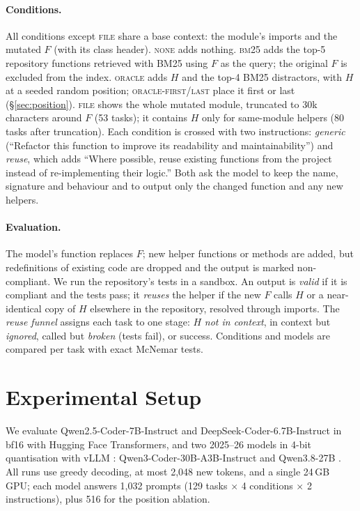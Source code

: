 \documentclass[11pt]{article}
\begin{document}
\paragraph{Conditions.}
All conditions except \textsc{file} share a base context: the module's imports and the mutated $F$
(with its class header). \textsc{none} adds nothing. \textsc{bm25} adds the top-5 repository functions
retrieved with BM25 using $F$ as the query; the original $F$ is excluded from the index.
\textsc{oracle} adds $H$ and the top-4 BM25 distractors, with $H$ at a seeded random position;
\textsc{oracle-first}/\textsc{last} place it first or last (\S\ref{sec:position}).
\textsc{file} shows the whole mutated module, truncated to 30k characters around $F$ (53 tasks);
it contains $H$ only for same-module helpers (80 tasks after truncation).
Each condition is crossed with two instructions: \emph{generic} (``Refactor this function to improve its
readability and maintainability'') and \emph{reuse}, which adds ``Where possible, reuse existing functions
from the project instead of re-implementing their logic.'' Both ask the model to keep the name, signature
and behaviour and to output only the changed function and any new helpers.

\paragraph{Evaluation.}
The model's function replaces $F$; new helper functions or methods are added, but redefinitions of existing
code are dropped and the output is marked non-compliant. We run the repository's tests in a sandbox.
An output is \emph{valid} if it is compliant and the tests pass; it \emph{reuses} the helper if the new $F$
calls $H$ or a near-identical copy of $H$ elsewhere in the repository, resolved through imports.
The \emph{reuse funnel} assigns each task to one stage: $H$ \emph{not in context}, in context but
\emph{ignored}, called but \emph{broken} (tests fail), or success. Conditions and models are compared
per task with exact McNemar tests.

\section{Experimental Setup}

We evaluate Qwen2.5-Coder-7B-Instruct \citep[Q2.5C-7B;][]{hui2024qwen25codertechnicalreport} and
DeepSeek-Coder-6.7B-Instruct \citep[DSC-6.7B;][]{guo2024deepseekcoderlargelanguagemodel} in bf16 with
Hugging Face Transformers, and two 2025--26 models in 4-bit quantisation with vLLM
\citep{kwon2023efficientmemorymanagementlarge}: Qwen3-Coder-30B-A3B-Instruct
\citep[Q3C-30B, a mixture of experts with 3B active parameters;][]{yang2025qwen3technicalreport,qwen3coder-awq}
and Qwen3.8-27B \citep[Q3.8-27B, thinking disabled;][]{qwen38-int4}. All runs use greedy decoding,
at most 2{,}048 new tokens, and a single 24\,GB GPU; each model answers 1{,}032 prompts
(129 tasks $\times$ 4 conditions $\times$ 2 instructions), plus 516 for the position ablation.
\end{document}
